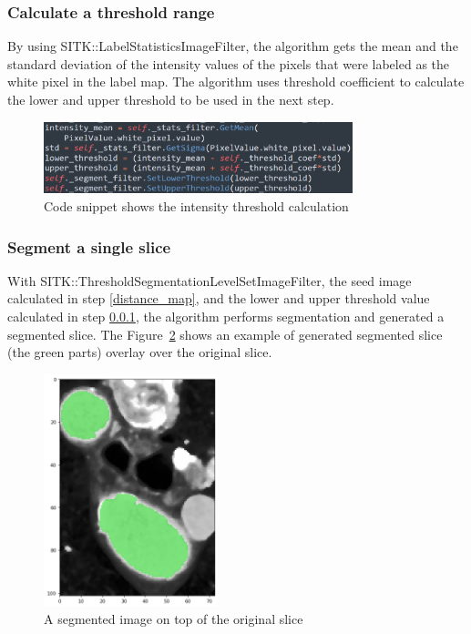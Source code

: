 \subsubsection{Calculate a threshold range} \label{threshold}
By using SITK::LabelStatisticsImageFilter, the algorithm gets the mean and the standard deviation of the intensity values of the pixels that were labeled as the white pixel in the label map. The algorithm uses threshold coefficient to calculate the lower and upper threshold to be used in the next step.

\begin{figure}[H]
    \centering
    \includegraphics[width=0.8\textwidth]{figures/AGR/threshold.png}
    \caption[Code that shows how to calculate the threshold range]{Code snippet shows the intensity threshold calculation}
    \label{fig_threshold}
\end{figure}

\subsubsection{Segment a single slice}
With SITK::ThresholdSegmentationLevelSetImageFilter, the seed image calculated in step \ref{distance_map}, and the lower and upper threshold value calculated in step \ref{threshold}, the algorithm performs segmentation and generated a segmented slice. The Figure~\ref{fig_segmented_image} shows an example of generated segmented slice (the green parts) overlay over the original slice.

\begin{figure}[H]
    \centering
    \includegraphics[width=0.45\textwidth]{figures/AGR/segment_label_image.png}
    \caption[A segmented image]{A segmented image on top of the original slice}
    \label{fig_segmented_image}
\end{figure}

